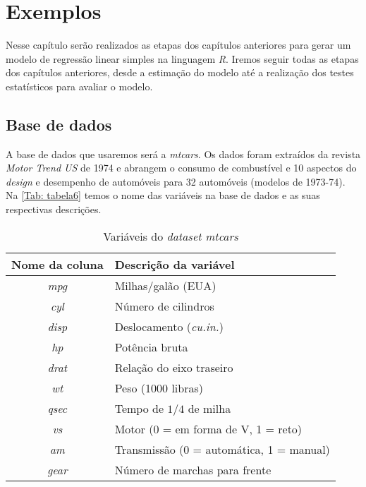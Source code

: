 \chapter{Exemplos}
\label{ch:exemplos}

\noindent Nesse capítulo serão realizados as etapas dos capítulos anteriores para gerar um modelo de regressão linear simples na linguagem \textit{R}. Iremos seguir todas as etapas dos capítulos anteriores, desde a estimação do modelo até a realização dos testes estatísticos para avaliar o modelo.

\section{Base de dados}

\noindent A base de dados que usaremos será a \textit{mtcars}. Os dados foram extraídos da revista \textit{Motor Trend US} de 1974 e abrangem o consumo de combustível e 10 aspectos do \textit{design} e desempenho de automóveis para 32 automóveis (modelos de 1973-74).\\

\noindent Na \autoref{Tab: tabela6} temos o nome das variáveis na base de dados e as suas respectivas descrições.

\begin{table}[H]
\caption{Variáveis do \textit{dataset mtcars}}
\centering
\begin{tabular}{cl}
\textbf{Nome da coluna} & \textbf{Descrição da variável} \\ \hline
\textit{mpg} & Milhas/galão (EUA)\\
\textit{cyl} & Número de cilindros\\
\textit{disp} & Deslocamento (\textit{cu.in.}) \\
\textit{hp} & Potência bruta \\
\textit{drat} & Relação do eixo traseiro \\
\textit{wt} & Peso (1000 libras) \\
\textit{qsec} & Tempo de $1/4$ de milha \\
\textit{vs} &  Motor (0 = em forma de V, 1 = reto) \\
\textit{am} & Transmissão (0 = automática, 1 = manual)\\
\textit{gear} & Número de marchas para frente\\ \hline
\end{tabular}
\label{Tab: tabela6}
\end{table}

